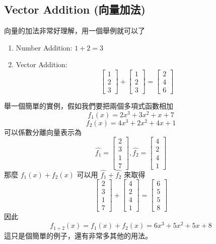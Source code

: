 \documentclass[11pt]{article}
\begin{document}
\subsection{Vector Addition (向量加法)}
向量的加法非常好理解，用一個舉例就可以了
\begin{enumerate}
    \item Number Addition: $1 + 2 = 3$
    \item Vector Addition: 
      \[
        \begin{bmatrix} 1 \\ 2 \\ 3 \end{bmatrix} + \begin{bmatrix} 1 \\ 2 \\ 3 \end{bmatrix} = \begin{bmatrix} 2 \\ 4 \\ 6 \end{bmatrix}
      \]
\end{enumerate}
舉一個簡單的實例，假如我們要把兩個多項式函數相加
\[
f_1(x) = 2x^3 + 3x^2 + x + 7
\]
\[
f_2(x) = 4x^3 + 2x^2 + 4x + 1
\]
可以係數分離向量表示為
\[
\hat{f_1} = \begin{bmatrix} 2 \\ 3 \\ 1 \\ 7 \end{bmatrix},
\hat{f_2} = \begin{bmatrix} 4 \\ 2 \\ 4 \\ 1 \end{bmatrix}
\]
那麼 $f_1(x) + f_2(x)$ 可以用 $\hat{f_1}  + \hat{f_2}$ 來取得
\[
\begin{bmatrix} 2 \\ 3 \\ 1 \\ 7 \end{bmatrix} + \begin{bmatrix} 4 \\ 2 \\ 4 \\ 1 \end{bmatrix} = \begin{bmatrix} 6 \\ 5 \\ 5 \\ 8 \end{bmatrix}
\]
因此
\[
f_{1+2}(x) = f_1(x) + f_2(x) = 6x^3 + 5x^2 + 5x + 8
\]
這只是個簡單的例子，還有非常多其他的用法。
\end{document}
